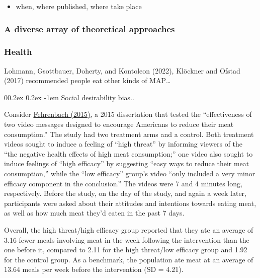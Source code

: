 \documentclass[
  man]{apa6}
\makeatletter
\providecommand{\tightlist}{%
  \setlength{\itemsep}{0pt}\setlength{\parskip}{0pt}}
\let\oldparagraph\paragraph
\renewcommand{\paragraph}[1]{\oldparagraph{#1}\mbox{}}
\renewcommand{\paragraph}{\@startsection{paragraph}{4}{\parindent}%
  {0\baselineskip \@plus 0.2ex \@minus 0.2ex}%
  {-1em}%
  {\normalfont\normalsize\bfseries\itshape\typesectitle}}
\makeatother
\begin{document}
\begin{itemize}
\tightlist
\item
  when, where published, where take place
\end{itemize}

\subsubsection{A diverse array of theoretical approaches}\label{a-diverse-array-of-theoretical-approaches}

\subsubsection{Health}\label{health}

Lohmann, Gsottbauer, Doherty, and Kontoleon (2022), Klöckner and Ofstad (2017) recommended people eat other kinds of MAP\ldots{}

\paragraph{Social desirability bias..}\label{social-desirability-bias..}

Consider \href{https://www.proquest.com/docview/1712399091?fromopenview=true&pq-origsite=gscholar}{Fehrenbach (2015)}, a 2015 dissertation that tested the ``effectiveness of two video messages designed to encourage Americans to reduce their meat consumption.'' The study had two treatment arms and a control. Both treatment videos sought to induce a feeling of ``high threat'' by informing viewers of the ``the negative health effects of high meat consumption;'' one video also sought to induce feelings of ``high efficacy'' by suggesting ``easy ways to reduce their meat consumption,'' while the ``low efficacy'' group's video ``only included a very minor efficacy component in the conclusion.'' The videos were 7 and 4 minutes long, respectively. Before the study, on the day of the study, and again a week later, participants were asked about their attitudes and intentions towards eating meat, as well as how much meat they'd eaten in the past 7 days.

Overall, the high threat/high efficacy group reported that they ate an average of 3.16 fewer meals involving meat in the week following the intervention than the one before it, compared to 2.11 for the high threat/low efficacy group and 1.92 for the control group. As a benchmark, the population ate meat at an average of 13.64 meals per week before the intervention (SD = 4.21).
\end{document}
